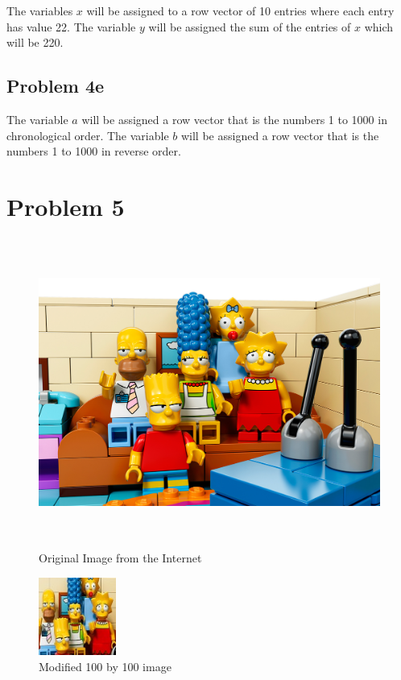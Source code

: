 \documentclass[11pt,psfig]{article}
\begin{document}
The variables $x$ will be assigned to a row vector of 10 entries where each entry has value 22. The variable $y$ will be assigned the sum of the entries of $x$ which will be 220.

\subsection*{Problem 4e}

The variable $a$ will be assigned a row vector that is the numbers 1 to 1000 in chronological order. The variable $b$ will be assigned a row vector that is the numbers 1 to 1000 in reverse order. 


\section*{Problem 5}

\begin{figure}[H]
\centering
\includegraphics[height=4in]{originalImageProb5.jpg}
\caption{Original Image from the Internet}
\end{figure}

\begin{figure}[H]
\centering
\includegraphics[height=1in]{modifiedImageProb5.jpg}
\caption{Modified 100 by 100 image}
\end{figure}
\end{document}
